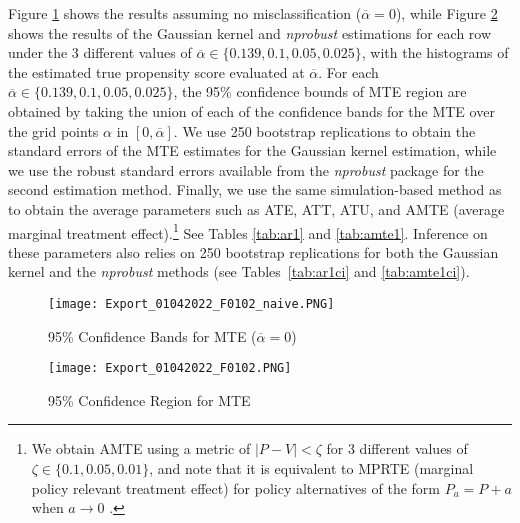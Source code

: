 \documentclass[11pt,reqno]{amsart}
\theoremstyle{plain}
\numberwithin{equation}{section}
\begin{document}
Figure \ref{fig.f0102naive} shows the results assuming no misclassification ($\overline{\alpha} = 0$), while Figure \ref{fig.f0102} shows the results of the Gaussian kernel and \textit{nprobust} estimations for each row under the 3 different values of $\overline{\alpha} \in \{0.139, 0.1, 0.05, 0.025\}$, with the histograms of the estimated true propensity score evaluated at $\overline{\alpha}$.
For each $\overline{\alpha} \in \{0.139, 0.1, 0.05, 0.025\}$, the 95\% confidence bounds of MTE region are obtained by taking the union of each of the confidence bands for the MTE over the grid points $\alpha$ in $[0, \overline{\alpha}]$.
We use 250 bootstrap replications to obtain the standard errors of the MTE estimates for the Gaussian kernel estimation, while we use the robust standard errors available from the \textit{nprobust} package for the second estimation method.
Finally, we use the same simulation-based method as \cite{Carneiroal2017} to obtain the average parameters such as ATE, ATT, ATU, and AMTE (average marginal treatment effect).\footnote{We obtain AMTE using a metric of $\vert P - V \vert < \zeta$ for 3 different values of $\zeta \in \{0.1, 0.05, 0.01\}$, and note that it is equivalent to MPRTE (marginal policy relevant treatment effect) for policy alternatives of the form $P_{a} = P + a$ when $a \rightarrow 0$ \citep{checkman2010}.} See Tables \ref{tab:ar1} and \ref{tab:amte1}. 
Inference on these parameters also relies on 250 bootstrap replications for both the Gaussian kernel and the \textit{nprobust} methods (see Tables~\ref{tab:ar1ci} and \ref{tab:amte1ci}).

\begin{figure}[h]
    \begin{minipage}{\textwidth}
    \texttt{[image: Export\_01042022\_F0102\_naive.PNG]}
    \centering
    \caption{95\% Confidence Bands for MTE ($\overline{\alpha} = 0$)}
    \label{fig.f0102naive}
    \end{minipage}
\end{figure}

\begin{figure}[h]
    \begin{minipage}{\textwidth}
    \texttt{[image: Export\_01042022\_F0102.PNG]}
    \centering
    \caption{95\% Confidence Region for MTE}
    \label{fig.f0102}
    \end{minipage}
\end{figure}
\end{document}
